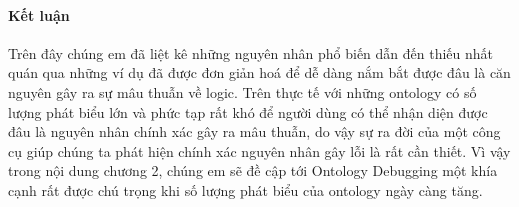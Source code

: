 \paragraph{Kết luận}
Trên đây chúng em đã liệt kê những nguyên nhân phổ biến dẫn đến thiếu nhất quán qua những ví dụ đã được đơn giản hoá để dễ dàng nắm bắt được đâu là căn nguyên gây ra sự mâu thuẫn về logic. Trên thực tế với những ontology có số lượng phát biểu lớn và phức tạp rất khó để người dùng có thể nhận diện được đâu là nguyên nhân chính xác gây ra mâu thuẫn, do vậy sự ra đời của một công cụ giúp chúng ta phát hiện chính xác nguyên nhân gây lỗi là rất cần thiết. Vì vậy trong nội dung chương 2, chúng em sẽ đề cập tới Ontology Debugging một khía cạnh rất được chú trọng khi số lượng phát biểu của ontology ngày càng tăng.

